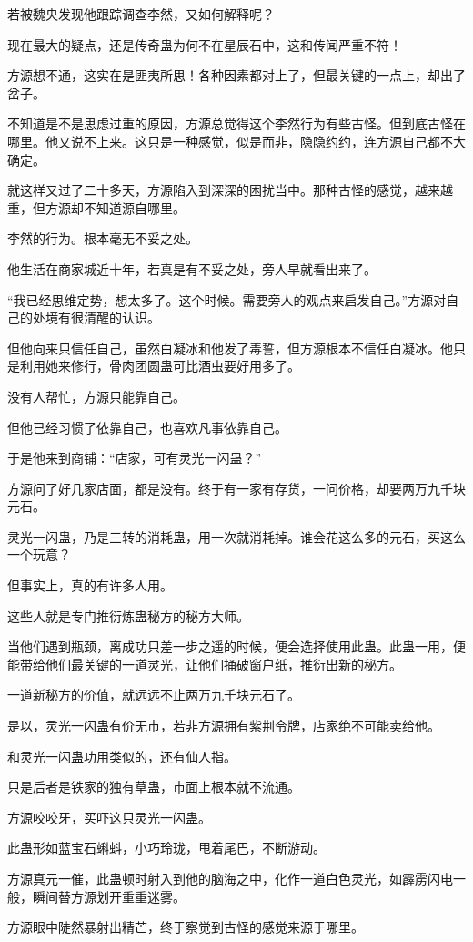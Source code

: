 \begin{this_body}
若被魏央发现他跟踪调查李然，又如何解释呢？

现在最大的疑点，还是传奇蛊为何不在星辰石中，这和传闻严重不符！

方源想不通，这实在是匪夷所思！各种因素都对上了，但最关键的一点上，却出了岔子。

不知道是不是思虑过重的原因，方源总觉得这个李然行为有些古怪。但到底古怪在哪里。他又说不上来。这只是一种感觉，似是而非，隐隐约约，连方源自己都不大确定。

就这样又过了二十多天，方源陷入到深深的困扰当中。那种古怪的感觉，越来越重，但方源却不知道源自哪里。

李然的行为。根本毫无不妥之处。

他生活在商家城近十年，若真是有不妥之处，旁人早就看出来了。

“我已经思维定势，想太多了。这个时候。需要旁人的观点来启发自己。”方源对自己的处境有很清醒的认识。

但他向来只信任自己，虽然白凝冰和他发了毒誓，但方源根本不信任白凝冰。他只是利用她来修行，骨肉团圆蛊可比酒虫要好用多了。

没有人帮忙，方源只能靠自己。

但他已经习惯了依靠自己，也喜欢凡事依靠自己。

于是他来到商铺：“店家，可有灵光一闪蛊？”

方源问了好几家店面，都是没有。终于有一家有存货，一问价格，却要两万九千块元石。

灵光一闪蛊，乃是三转的消耗蛊，用一次就消耗掉。谁会花这么多的元石，买这么一个玩意？

但事实上，真的有许多人用。

这些人就是专门推衍炼蛊秘方的秘方大师。

当他们遇到瓶颈，离成功只差一步之遥的时候，便会选择使用此蛊。此蛊一用，便能带给他们最关键的一道灵光，让他们捅破窗户纸，推衍出新的秘方。

一道新秘方的价值，就远远不止两万九千块元石了。

是以，灵光一闪蛊有价无市，若非方源拥有紫荆令牌，店家绝不可能卖给他。

和灵光一闪蛊功用类似的，还有仙人指。

只是后者是铁家的独有草蛊，市面上根本就不流通。

方源咬咬牙，买吓这只灵光一闪蛊。

此蛊形如蓝宝石蝌蚪，小巧玲珑，甩着尾巴，不断游动。

方源真元一催，此蛊顿时射入到他的脑海之中，化作一道白色灵光，如霹雳闪电一般，瞬间替方源划开重重迷雾。

方源眼中陡然暴射出精芒，终于察觉到古怪的感觉来源于哪里。


\end{this_body}
